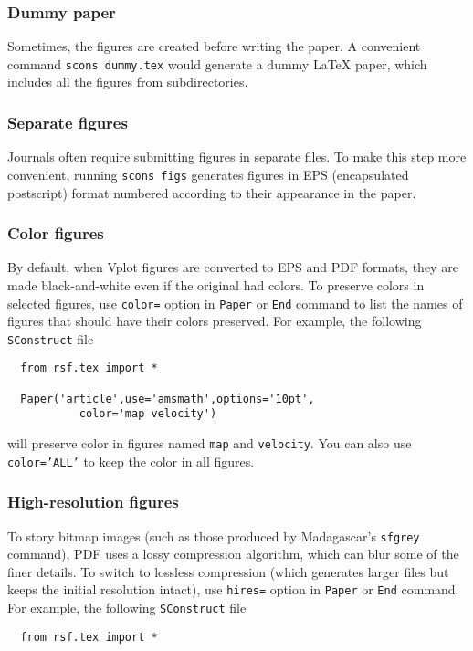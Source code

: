 {{\subsubsection{Dummy paper}

Sometimes, the figures are created before writing the paper. A
convenient command \texttt{scons dummy.tex} would generate a dummy \LaTeX
paper, which includes all the figures from subdirectories.

\subsubsection{Separate figures}

Journals often require submitting figures in separate files. To make
this step more convenient, running \texttt{scons figs} generates
figures in EPS (encapsulated postscript) format numbered according to
their appearance in the paper.

\subsubsection{Color figures}

By default, when Vplot figures are converted to EPS and PDF formats,
they are made black-and-white even if the original had colors. To
preserve colors in selected figures, use \texttt{color=} option in
\texttt{Paper} or \texttt{End} command to list the names of figures
that should have their colors preserved. For example, the following
\texttt{SConstruct} file
\lstset{language=python,showstringspaces=false,frame=single}
\begin{lstlisting}
  from rsf.tex import *

  Paper('article',use='amsmath',options='10pt',
           color='map velocity')
\end{lstlisting}
will preserve color in figures named \texttt{map} and
\texttt{velocity}. You can also use \texttt{color='ALL'} to keep the
color in all figures.

\subsubsection{High-resolution figures}

To story bitmap images (such as those produced by Madagascar's
\texttt{sfgrey} command), PDF uses  a lossy compression algorithm,
which can blur some of the finer details. To switch to lossless
compression (which generates larger files but keeps the initial
resolution intact), use \texttt{hires=} option in
\texttt{Paper} or \texttt{End} command. For example, the following
\texttt{SConstruct} file
\lstset{language=python,showstringspaces=false,frame=single}
\begin{lstlisting}
  from rsf.tex import *


\end{lstlisting}}}
